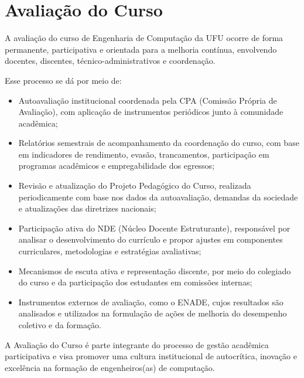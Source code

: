 \section{Avaliação do Curso}

A avaliação do curso de Engenharia de Computação da UFU ocorre de forma permanente, participativa e orientada para a melhoria contínua, envolvendo docentes, discentes, técnico-administrativos e coordenação.

Esse processo se dá por meio de:

\begin{itemize}
    \item Autoavaliação institucional coordenada pela CPA (Comissão Própria de Avaliação), com aplicação de instrumentos periódicos junto à comunidade acadêmica;
    \item Relatórios semestrais de acompanhamento da coordenação do curso, com base em indicadores de rendimento, evasão, trancamentos, participação em programas acadêmicos e empregabilidade dos egressos;
    \item Revisão e atualização do Projeto Pedagógico do Curso, realizada periodicamente com base nos dados da autoavaliação, demandas da sociedade e atualizações das diretrizes nacionais;
    \item Participação ativa do NDE (Núcleo Docente Estruturante), responsável por analisar o desenvolvimento do currículo e propor ajustes em componentes curriculares, metodologias e estratégias avaliativas;
    \item Mecanismos de escuta ativa e representação discente, por meio do colegiado do curso e da participação dos estudantes em comissões internas;
    \item Instrumentos externos de avaliação, como o ENADE, cujos resultados são analisados e utilizados na formulação de ações de melhoria do desempenho coletivo e da formação.
\end{itemize}
    
A Avaliação do Curso é parte integrante do processo de gestão acadêmica participativa e visa promover uma cultura institucional de autocrítica, inovação e excelência na formação de engenheiros(as) de computação.